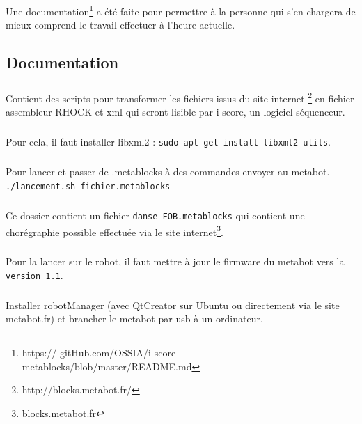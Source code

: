 \documentclass[10pt,a4paper]{report}
\begin{document}
Une documentation\footnote{https:// gitHub.com/OSSIA/i-score-metablocks/blob/master/README.md} a été faite pour permettre à la personne qui s'en chargera de mieux comprend le travail effectuer à l'heure actuelle.


\def\appendixpage{\vspace*{8cm} 
\begin{center} 
\Huge\textbf{Annexes} 
\end{center} 
} 
\def\appendixname{Annexe}%

\begin{appendices} 
\chapter{Documentation} 
\paragraph{}
Contient des scripts pour transformer les fichiers issus du site internet \footnote{http://blocks.metabot.fr/} en fichier assembleur RHOCK et xml qui seront lisible par i-score, un logiciel séquenceur.
\paragraph{}
Pour cela, il faut installer libxml2 : 
\texttt{sudo apt get install libxml2-utils}.
\paragraph{}
Pour lancer et passer de .metablocks à des commandes envoyer au metabot.
\texttt{./lancement.sh fichier.metablocks}
\paragraph{}
Ce dossier contient un fichier \texttt{danse\_FOB.metablocks} qui contient une chorégraphie possible effectuée via le site internet\footnote{blocks.metabot.fr}.
\paragraph{}
Pour la lancer sur le robot, il faut mettre à jour le firmware du metabot vers la \texttt{version 1.1}.
\paragraph{}
Installer robotManager (avec QtCreator sur Ubuntu ou directement via le site metabot.fr) et brancher le metabot par usb à un ordinateur.

\end{appendices}
\end{document}
